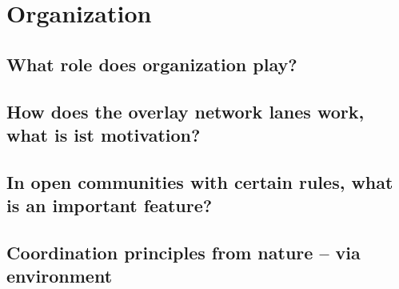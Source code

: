 \section{Organization}
\subsection{What role does organization play?}
\subsection{How does the overlay network lanes work, what is ist motivation?}
\subsection{In open communities with certain rules, what is an important feature?}
\subsection{Coordination principles from nature – via environment}
